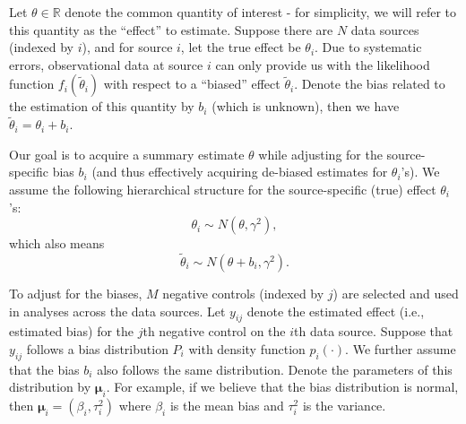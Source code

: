 \documentclass{article}
\begin{document}
Let $\theta \in \mathbb{R}$ denote the common quantity of interest - for simplicity, we will refer to this quantity as the ``effect'' to estimate.
Suppose there are $N$ data sources (indexed by $i$), and for source $i$, let the true effect be $\theta_i$.
Due to systematic errors, observational data at source $i$ can only provide us with the likelihood function $f_i(\tilde{\theta}_i)$
with respect to a ``biased'' effect $\tilde{\theta}_i$.
Denote the bias related to the estimation of this quantity by $b_i$ (which is unknown), then we have $\tilde{\theta}_i = \theta_i + b_i$.

Our goal is to acquire a summary estimate $\theta$
while adjusting for the source-specific bias $b_i$ (and thus effectively acquiring de-biased estimates for $\theta_i$'s).
We assume the following hierarchical structure for the source-specific (true) effect $\theta_i$'s:
\begin{equation}
\label{eq: theta_i-dist}
    \theta_i \sim N(\theta, \gamma^2),
\end{equation}
which also means
\begin{equation}
    \tilde\theta_i \sim N(\theta+b_i, \gamma^2).
\end{equation}



To adjust for the biases, $M$ negative controls (indexed by $j$) are selected and used in analyses across the data sources.
Let $y_{ij}$ denote the estimated effect (i.e., estimated bias) for the $j$th negative control on the $i$th data source. Suppose that $y_{ij}$ follows a bias distribution $P_i$ with density function $p_i(\cdot)$.
We further assume that the bias $b_i$ also follows the same distribution.
Denote the parameters of this distribution by $\boldsymbol\mu_i$.
For example, if we believe that the bias distribution is normal,
then $\boldsymbol\mu_i = (\beta_i, \tau_i^2)$ where $\beta_i$ is the mean bias and $\tau_i^2$ is the variance.
\end{document}
